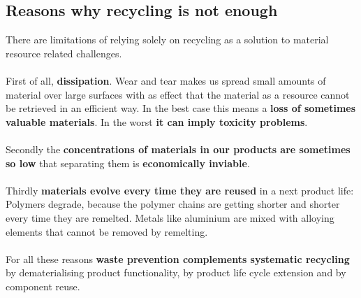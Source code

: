 \documentclass[../summary.tex]{subfiles}
\begin{document}
\subsection{Reasons why recycling is not enough}

There are limitations of relying solely on recycling as a solution to material resource related challenges.
\\\\
First of all, \textbf{dissipation}. Wear and tear makes us spread small amounts of material over large surfaces with as effect that the material as a resource cannot be retrieved in an efficient way. In the best case this means a \textbf{loss of sometimes valuable materials}. In the worst \textbf{it can imply toxicity problems}.
\\\\
Secondly the \textbf{concentrations of materials in our products are sometimes so low} that separating them is \textbf{economically inviable}.
\\\\
Thirdly \textbf{materials evolve every time they are reused} in a next product life: Polymers degrade, because the polymer chains are getting shorter and shorter every time they are remelted. Metals like aluminium are mixed with alloying elements that cannot be removed by remelting.
\\\\
For all these reasons \textbf{waste prevention complements systematic recycling} by dematerialising product functionality, by product life cycle extension and by component reuse.
\end{document}
